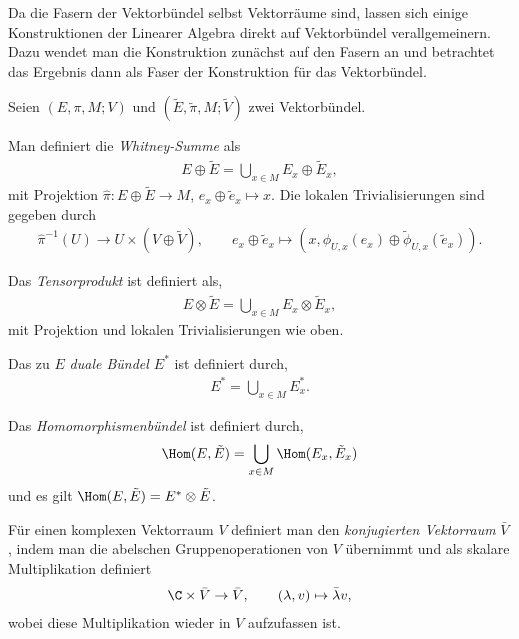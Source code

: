 \documentclass[%
	paper=a5,%
	fleqn,%
	DIV=18,%
	BCOR=0mm,
	fontsize=11pt,
	titlepage=false,%
	bibliography=totoc,
	DIV=18,%
	twoside=true,
	pdftitle=Riemannsche Geometrie,
	pdfauthor=Uwe Semmelmann,
	numbers=noendperiod]%
	{scrbook}
\begin{document}
Da die Fasern der Vektorbündel selbst Vektorräume sind, lassen sich einige
Konstruktionen der Linearer Algebra direkt auf Vektorbündel
verallgemeinern. Dazu wendet man die Konstruktion zunächst auf den Fasern
an und betrachtet das Ergebnis dann als Faser der Konstruktion für das
Vektorbündel.

\begin{defn}
Seien $(E,\pi,M;V)$ und $(\tilde{E},\tilde{\pi},M;\tilde{V})$ zwei Vektorbündel.
\begin{defnenum}
\item Man definiert die \emph{Whitney-Summe} als
\begin{align*}
E\oplus \tilde{E} = \bigcup_{x\in M} E_x\oplus \tilde{E}_x,
\end{align*}
mit Projektion $\hat{\pi} \colon E\oplus \tilde{E}\to M$, $e_x\oplus
\tilde{e}_x\mapsto x$. Die lokalen Trivialisierungen sind gegeben durch
\begin{align*}
\hat{\pi}^{-1}(U)\to U\times (V\oplus \tilde{V}),\qquad
e_x\oplus \tilde{e}_x \mapsto (x,\phi_{U,x}(e_x)\oplus
\tilde{\phi}_{U,x}(\tilde{e}_x)).
\end{align*}
\item Das \emph{Tensorprodukt} ist definiert als,
\begin{align*}
E\otimes \tilde{E} = \bigcup_{x\in M} E_x\otimes \tilde{E}_x,
\end{align*}
mit Projektion und lokalen Trivialisierungen wie oben.
\item Das zu $E$ \emph{duale Bündel $E^*$} ist definiert durch,
\begin{align*}
E^* = \bigcup_{x\in M} E_x^*.
\end{align*}
\item Das \emph{Homomorphismenbündel} ist definiert durch,
\begin{align*}
\Hom(E,\tilde{E}) = \bigcup_{x\in M} \Hom(E_x,\tilde{E}_x)
\end{align*}
und es gilt $\Hom(E,\tilde{E}) =  E^* \otimes \tilde{E}$.\fish
\end{defnenum}
\end{defn}

Für einen komplexen Vektorraum $V$ definiert man den \textit{konjugierten
Vektorraum} $\bar{V}$, indem man die abelschen Gruppenoperationen von $V$
übernimmt und als skalare Multiplikation definiert
\begin{align*}
\C\times \bar{V}\to \bar{V},\qquad (\lambda,v)\mapsto \bar{\lambda}v,
\end{align*}
wobei diese Multiplikation wieder in $V$ aufzufassen ist.
\end{document}
